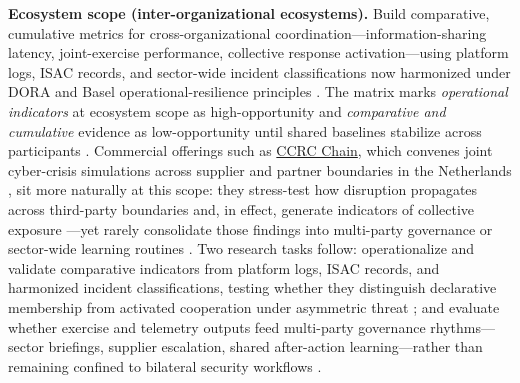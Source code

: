 \textbf{Ecosystem scope (inter-organizational ecosystems).} Build comparative, cumulative metrics for cross-organizational coordination---information-sharing latency, joint-exercise performance, collective response activation---using platform logs, ISAC records, and sector-wide incident classifications now harmonized under DORA and Basel operational-resilience principles \autocite{ecb2018tiber,bcbs2021operational,european2022regulation}. The matrix marks \emph{operational indicators} at ecosystem scope as high-opportunity and \emph{comparative and cumulative} evidence as low-opportunity until shared baselines stabilize across participants \autocite{mermoud2019share,gillard2023efficient}. Commercial offerings such as \href{https://ccrc.nl/chain-cyber-crisis-exercises/}{CCRC Chain}, which convenes joint cyber-crisis simulations across supplier and partner boundaries in the Netherlands \autocite{ecb2018tiber,european2022regulation,ccrc2024chain}, sit more naturally at this scope: they stress-test how disruption propagates across third-party boundaries and, in effect, generate indicators of collective exposure \autocite{dupont2019cyberresilience,hausken2020cyber}---yet rarely consolidate those findings into multi-party governance or sector-wide learning routines \autocite{skopik2016problem}. Two research tasks follow: operationalize and validate comparative indicators from platform logs, ISAC records, and harmonized incident classifications, testing whether they distinguish declarative membership from activated cooperation under asymmetric threat \autocite{enisa2017isacs,mermoud2019share}; and evaluate whether exercise and telemetry outputs feed multi-party governance rhythms---sector briefings, supplier escalation, shared after-action learning---rather than remaining confined to bilateral security workflows \autocite{arnold2004informationsharing,skopik2016problem,lostri2022shared}.

